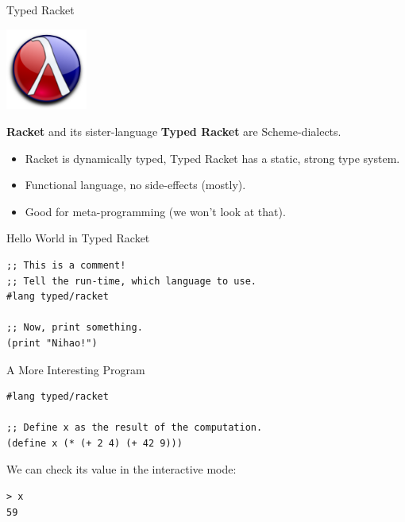 \documentclass{beamer}
\begin{document}
\begin{frame}{Typed Racket}

  \begin{center}
    \includegraphics[width=0.2\textwidth]{racket.png}
  \end{center}

  \textbf{Racket} and its sister-language \textbf{Typed Racket} are Scheme-dialects.

  \begin{itemize}
  \pause{} \item Racket is dynamically typed, Typed Racket has a static, strong type system.
  \pause{} \item Functional language, no side-effects (mostly).
  \pause{} \item Good for meta-programming (we won't look at that).
  \end{itemize}
\end{frame}

\begin{frame}[fragile]{Hello World in Typed Racket}
\begin{center}
\begin{lstlisting}
;; This is a comment!
;; Tell the run-time, which language to use.
#lang typed/racket

;; Now, print something.
(print "Nihao!")
\end{lstlisting}
\end{center}
\end{frame}

\begin{frame}[fragile]{A More Interesting Program}
\begin{lstlisting}
#lang typed/racket

;; Define x as the result of the computation.
(define x (* (+ 2 4) (+ 42 9)))
\end{lstlisting}

\pause{}

We can check its value in the interactive mode:

\begin{lstlisting}
> x
59
\end{lstlisting}

\end{frame}
\end{document}
